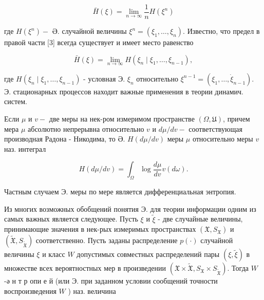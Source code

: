 \documentclass[10pt]{article}
\begin{document}
\[

\bar{H}(\xi)=\lim _{n \rightarrow \infty} \frac{1}{n} H\left(\xi^{n}\right)

\]



где $H\left(\xi^{n}\right)-$ Ә. случайной величины $\xi^{n}=\left(\xi_{1}, \ldots, \xi_{n}\right)$. Известно, что предел в правой части [3] всегда существует и имеет место равенство



\[

\bar{H}(\xi)=\lim _{n \rightarrow \infty} H\left(\xi_{n} \mid \xi_{1}, \ldots, \xi_{n-1}\right),

\]



где $H\left(\xi_{n} \mid \xi_{1}, \ldots, \xi_{n-1}\right)$ - условная Э. $\xi_{n}$ относительно $\xi^{n-1}=\left(\xi_{1}, \ldots, \dot{\xi}_{n-1}\right)$. Э. стационарных процессов находит важные применения в теории динамич. систем.



Если $\mu$ и $v-$ две меры на нек-ром измеримом пространстве $(\Omega, \mathfrak{U})$, причем мера $\mu$ абсолютно непрерывна относительно $v$ и $d \mu / d v-$ соответствующая производная Радона - Никодима, то Ә. $H(d \mu / d v)$ меры $\mu$ относительно меры $v$ наз. интеграл



\[

H(d \mu / d v)=\int_{\Omega} \log \frac{d \mu}{d v} v(d \omega) .

\]



Частным случаем Э. меры по мере является дифференциальная энтропия.



Из многих возможных обобщений понятия Э. для теории информации одним из самых важных является следующее. Пусть $\xi$ и $\tilde{\xi}$ - две случайные величины, принимающие значения в нек-рых измеримых пространствах $\left(\mathfrak{X}, S_{\mathfrak{X}}\right)$ и $\left(\tilde{\mathfrak{X}}, S_{\tilde{\mathfrak{X}}}\right)$ соответственно. Пусть заданы распределение $p(\cdot)$ случайной величины $\xi$ и класс $W$ допустимых совместных распределений пары $(\xi, \tilde{\xi})$ в множестве всех вероятностных мер в произведении $\left(\mathfrak{X} \times \tilde{\mathfrak{X}}, S_{\mathfrak{X}} \times S_{\tilde{\mathfrak{X}}}\right)$. Тогда $W$-ә н т р опи е й (или $Э$. при заданном условии сообщений точности воспроизведения $W$ ) наз. величина
\end{document}
